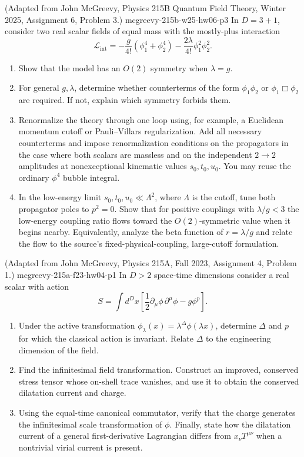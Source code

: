 \begin{enumerate}
  {(Adapted from John McGreevy, Physics 215B Quantum Field Theory, Winter 2025, Assignment 6, Problem 3.)}
  {mcgreevy-215b-w25-hw06-p3}
In \(D=3+1\), consider two real scalar fields of equal mass with the
mostly-plus interaction
\[
 \mathcal L_{\mathrm{int}}
 =-\frac{g}{4!}\left(\phi_1^4+\phi_2^4\right)
 -\frac{2\lambda}{4!}\phi_1^2\phi_2^2.
\]
\begin{enumerate}
\item
Show that the model has an \(O(2)\) symmetry when \(\lambda=g\).
\item
For general \(g,\lambda\), determine whether counterterms of the form
\(\phi_1\phi_2\) or \(\phi_1\Box\phi_2\) are required.  If not, explain
which symmetry forbids them.
\item
Renormalize the theory through one loop using, for example, a Euclidean
momentum cutoff or Pauli--Villars regularization.  Add all necessary
counterterms and impose renormalization conditions on the propagators in
the case where both scalars are massless and on the independent
\(2\to2\) amplitudes at nonexceptional kinematic values
\(s_0,t_0,u_0\).  You may reuse the ordinary \(\phi^4\) bubble integral.
\item
In the low-energy limit \(s_0,t_0,u_0\ll\Lambda^2\), where \(\Lambda\) is
the cutoff, tune both propagator poles to \(p^2=0\).  Show that for positive
couplings with \(\lambda/g<3\) the low-energy coupling ratio flows toward
the \(O(2)\)-symmetric value when it begins nearby.  Equivalently, analyze
the beta function of \(r=\lambda/g\) and relate the flow to the source's
fixed-physical-coupling, large-cutoff formulation.
\end{enumerate}

  {(Adapted from John McGreevy, Physics 215A, Fall 2023, Assignment 4, Problem 1.)}
  {mcgreevy-215a-f23-hw04-p1}
In \(D>2\) space-time dimensions consider a real scalar with action
\[
 S=\int d^Dx\left[
 \frac12\partial_\mu\phi\,\partial^\mu\phi-g\phi^p
 \right].
\]
\begin{enumerate}
\item
Under the active transformation
\(\phi_\lambda(x)=\lambda^\Delta\phi(\lambda x)\), determine
\(\Delta\) and \(p\) for which the classical action is invariant.  Relate
\(\Delta\) to the engineering dimension of the field.
\item
Find the infinitesimal field transformation.  Construct an improved,
conserved stress tensor whose on-shell trace vanishes, and use it to obtain
the conserved dilatation current and charge.
\item
Using the equal-time canonical commutator, verify that the charge generates
the infinitesimal scale transformation of \(\phi\).  Finally, state how the
dilatation current of a general first-derivative Lagrangian differs from
\(x_\nu T^{\mu\nu}\) when a nontrivial virial current is present.
\end{enumerate}
\end{enumerate}
